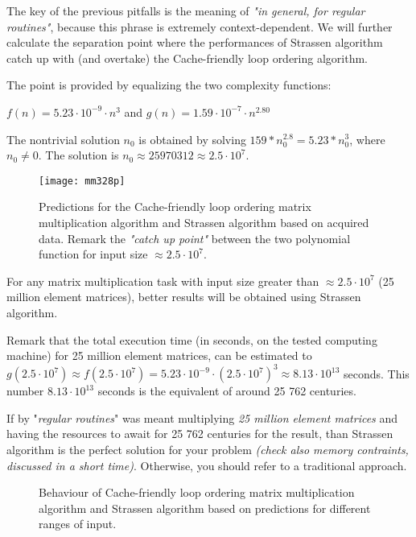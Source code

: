 The key of the previous pitfalls is the meaning of \textit{"in general, for regular routines"}, because this phrase is extremely context-dependent. We will further calculate the separation point where the performances of Strassen algorithm catch up with (and overtake) the Cache-friendly loop ordering algorithm.

The point is provided by equalizing the two complexity functions:

$f(n) = 5.23 \cdot 10^{-9} \cdot n^{3} $ and $g(n) = 1.59 \cdot 10^{-7} \cdot n^{2.80} $

The nontrivial solution $n_{0}$ is obtained by solving $ 159 * n_{0}^{2.8} = 5.23* n_{0}^3 $, where $n_{0} \neq 0$. The solution is $n_{0} \approx 25970312 \approx 2.5 \cdot 10^7$.

\begin{figure}[H]
\centering
\texttt{[image: mm328p]}
\caption{Predictions for the Cache-friendly loop ordering matrix multiplication algorithm and Strassen algorithm based on acquired data. Remark the \textit{"catch up point"} between the two polynomial function for input size $\approx 2.5 \cdot 10^7$. }
\end{figure}

For any matrix multiplication task with input size greater than $\approx 2.5 \cdot 10^7$ (25 million element matrices), better results will be obtained using Strassen algorithm.

Remark that the total execution time (in seconds, on the tested computing machine) for 25 million element matrices, can be estimated to $g(2.5 \cdot 10^7) \approx f(2.5 \cdot 10^7) = 5.23 \cdot 10^{-9} \cdot (2.5 \cdot 10^7)^{3} \approx 8.13 \cdot 10^{13}$ seconds. This number $8.13 \cdot 10^{13} $ seconds is the equivalent of around 25 762 centuries. 

If by "\textit{regular routines}" was meant multiplying \textit{25 million element matrices} and having the resources to await for 25 762 centuries for the result, than Strassen algorithm is the perfect solution for your problem \textit{(check also memory contraints, discussed in a short time)}. Otherwise, you should refer to a traditional approach.

\begin{figure}[H]
\caption{Behaviour of Cache-friendly loop ordering matrix multiplication algorithm and Strassen algorithm based on predictions for different ranges of input.}
\end{figure}


